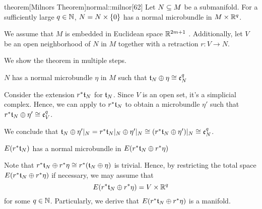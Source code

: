 \begin{scope}
    \newcommand{\rwhitney} {
        \whitney{\ind{r}\bt_N}{\ind{r}\eta}
    }
    \newcommand{\rtn} {
        \ind{r}\bt_N
    }


    \begin{mystatement}{theorem}[Milnors Theorem]{normal::milnor}[62]
        Let $N \sub M$ be a submanifold.
        For a sufficiently large $q \in \N$, $N = \cyldown{N}$ has a normal microbundle in $M \cross \R^q$.
    \end{mystatement}

    \begin{myproof}
        We assume that $M$ is embedded in Euclidean space $\R^{2m + 1}$ \cite[p.60]{dimension}.
        Additionally, let $V$ be an open neighborhood of $N$ in $M$ together with a retraction $r: V \to N$.

        We show the theorem in multiple steps.
        \begin{steps}
            \item $N$ has a normal microbundle $\eta$ in $M$ such that $\whitney{\bt_N}{\eta} \cong \be[q]{N}$
            
            Consider the extension $\ind{r}\bt_N$ for $\bt_N$.
            Since $V$ is an open set, it's a simplicial complex.
            Hence, we can apply  to $\ind{r}\bt_N$
            to obtain a microbundle $\eta'$ such that $\whitney{\ind{r}\bt_N}{\eta'} \cong \be[q]{V}$.

            We conclude that $\whitney{\bt_N}{\eta'\restr{N}} = \whitney{\ind{r}\bt_N\restr{N}}{\eta'\restr{N}} \cong (\whitney{\ind{r}\bt_N}{\eta'})\restr{N} \cong \be[q]{N}$.

            \item $E(\rtn)$ has a normal microbundle in $E(\rwhitney)$

            Note that $\rwhitney \cong \ind{r}(\whitney{\bt_N}{\eta})$ is trivial.
            Hence, by restricting the total space $E(\rwhitney)$ if necessary,
            we may assume that
            \[ E(\rwhitney) = V \cross \R^q \]
            for some $q \in \N$.
            Particularly, we derive that $E(\rwhitney)$ is a manifold.


\end{steps}
\end{myproof}
\end{scope}
